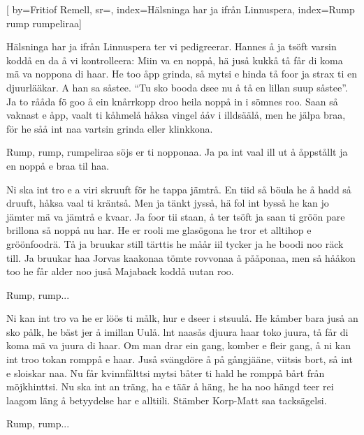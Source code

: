 

[ 		%
	by={Fritiof Remell},					%
	sr={},					%
	index={Hälsninga har ja ifrån Linnuspera}, 						%
	index={Rump rump rumpeliraa}]						%
	

\beginverse*						%
Hälsninga har ja ifrån Linnuspera
ter vi pedigreerar.
Hannes å ja tsöft varsin koddå en da
å vi kontrolleera:
Miin va en noppå, hä juså kukkå
tå får di koma mä va noppona di haar.
He too åpp grinda, så mytsi e hinda
tå foor ja strax ti en djuurlääkar.
A han sa såstee. ``Tu sko booda dsee
nu å tå en lillan suup såstee''.
Ja to rååda fö goo å ein knårrkopp droo
heila noppå in i sömnes roo.
Saan så vaknast e åpp, vaalt ti kåhmelå
håksa vingel ååv i illdsäälå,
men he jälpa braa, för he såå int naa
vartsin grinda eller klinkkona.
\endverse							%

\beginchorus
Rump, rump, rumpeliraa
söjs er ti nopponaa.
Ja pa int vaal ill ut å åppstållt ja
en noppå e braa til haa.
\endchorus

\beginverse*						%
Ni ska int tro e a viri skruuft
för he tappa jämtrå.
En tiid så böula he å hadd så druuft,
håksa vaal ti kräntså.
Men ja tänkt jysså, hä fol int bysså
he kan jo jämter mä va jämtrå e kvaar.
Ja foor tii staan, å ter tsöft ja saan
ti gröön pare brillona så noppå nu har.
He er rooli me glasögona he tror et
alltihop e gröönfoodrä.
Tå ja bruukar still tärttis he måår iil
tycker ja he boodi noo räck till.
Ja bruukar haa Jorvas kaakonaa
tömte rovvonaa å pååponaa,
men så hååkon too he får alder noo
juså Majaback koddå uutan roo.
\endverse	

\beginchorus		
Rump, rump...
\endchorus					%

\beginverse*						%
Ni kan int tro va he er löös ti målk,
hur e dseer i stsuulå.
He kåmber bara juså an sko pålk,
he bäst jer å imillan Uulå.
lnt naasås djuura haar toko juura,
tå får di koma mä va juura di haar.
Om man drar ein gang, komber e
fleir gang, å ni kan int troo tokan
romppå e haar.
Juså svängdöre å på gångjääne,
viitsis bort, så int e sloiskar naa.
Nu får kvinnfålttsi mytsi båter ti
hald he romppå bårt från möjkhinttsi.
Nu ska int an träng, ha e täär å häng,
he ha noo hängd teer rei laagom läng
å betyydelse har e alltiili. Stämber
Korp-Matt saa tacksägelsi.
\endverse	

\beginchorus	
Rump, rump...
\endchorus						%

\endsong							%

